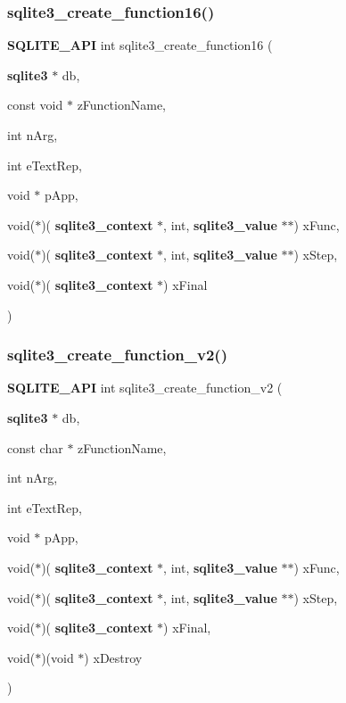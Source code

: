 \mbox{\label{sqlite3_8h_a8751bf4e2e9dbc53f2df8c00a53b3ace}} 
\subsubsection{sqlite3\_create\_function16()}
{\footnotesize\ttfamily \textbf{ S\+Q\+L\+I\+T\+E\+\_\+\+A\+PI} int sqlite3\+\_\+create\+\_\+function16 (\begin{DoxyParamCaption}\item[{\textbf{ sqlite3} $\ast$}]{db,  }\item[{const void $\ast$}]{z\+Function\+Name,  }\item[{int}]{n\+Arg,  }\item[{int}]{e\+Text\+Rep,  }\item[{void $\ast$}]{p\+App,  }\item[{void($\ast$)(\textbf{ sqlite3\+\_\+context} $\ast$, int, \textbf{ sqlite3\+\_\+value} $\ast$$\ast$)}]{x\+Func,  }\item[{void($\ast$)(\textbf{ sqlite3\+\_\+context} $\ast$, int, \textbf{ sqlite3\+\_\+value} $\ast$$\ast$)}]{x\+Step,  }\item[{void($\ast$)(\textbf{ sqlite3\+\_\+context} $\ast$)}]{x\+Final }\end{DoxyParamCaption})}

\mbox{\label{sqlite3_8h_aea30a470c3e6fcd38c0399fd348ce7c2}} 
\subsubsection{sqlite3\_create\_function\_v2()}
{\footnotesize\ttfamily \textbf{ S\+Q\+L\+I\+T\+E\+\_\+\+A\+PI} int sqlite3\+\_\+create\+\_\+function\+\_\+v2 (\begin{DoxyParamCaption}\item[{\textbf{ sqlite3} $\ast$}]{db,  }\item[{const char $\ast$}]{z\+Function\+Name,  }\item[{int}]{n\+Arg,  }\item[{int}]{e\+Text\+Rep,  }\item[{void $\ast$}]{p\+App,  }\item[{void($\ast$)(\textbf{ sqlite3\+\_\+context} $\ast$, int, \textbf{ sqlite3\+\_\+value} $\ast$$\ast$)}]{x\+Func,  }\item[{void($\ast$)(\textbf{ sqlite3\+\_\+context} $\ast$, int, \textbf{ sqlite3\+\_\+value} $\ast$$\ast$)}]{x\+Step,  }\item[{void($\ast$)(\textbf{ sqlite3\+\_\+context} $\ast$)}]{x\+Final,  }\item[{void($\ast$)(void $\ast$)}]{x\+Destroy }\end{DoxyParamCaption})}

